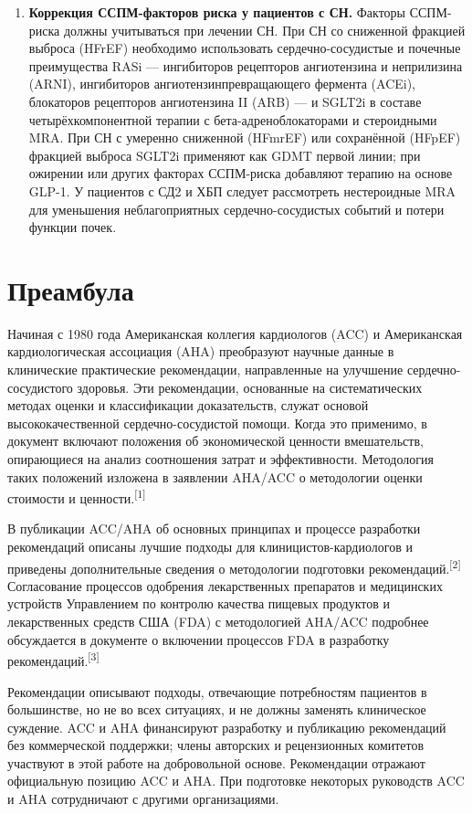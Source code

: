 \documentclass[11pt,a4paper]{article}
\newcommand{\src}[1]{\textsuperscript{[#1]}}
\begin{document}
\begin{enumerate}[label=\arabic*.]
\item \textbf{Коррекция ССПМ-факторов риска у пациентов с СН.} Факторы ССПМ-риска должны учитываться при лечении СН. При СН со сниженной фракцией выброса (HFrEF) необходимо использовать сердечно-сосудистые и почечные преимущества RASi --- ингибиторов рецепторов ангиотензина и неприлизина (ARNI), ингибиторов ангиотензинпревращающего фермента (ACEi), блокаторов рецепторов ангиотензина II (ARB) --- и SGLT2i в составе четырёхкомпонентной терапии с бета-адреноблокаторами и стероидными MRA. При СН с умеренно сниженной (HFmrEF) или сохранённой (HFpEF) фракцией выброса SGLT2i применяют как GDMT первой линии; при ожирении или других факторах ССПМ-риска добавляют терапию на основе GLP-1. У пациентов с СД2 и ХБП следует рассмотреть нестероидные MRA для уменьшения неблагоприятных сердечно-сосудистых событий и потери функции почек.
\end{enumerate}

\section*{Преамбула}
Начиная с 1980 года Американская коллегия кардиологов (ACC) и Американская кардиологическая ассоциация (AHA) преобразуют научные данные в клинические практические рекомендации, направленные на улучшение сердечно-сосудистого здоровья. Эти рекомендации, основанные на систематических методах оценки и классификации доказательств, служат основой высококачественной сердечно-сосудистой помощи. Когда это применимо, в документ включают положения об экономической ценности вмешательств, опирающиеся на анализ соотношения затрат и эффективности. Методология таких положений изложена в заявлении AHA/ACC о методологии оценки стоимости и ценности.\src{1}

В публикации ACC/AHA об основных принципах и процессе разработки рекомендаций описаны лучшие подходы для клиницистов-кардиологов и приведены дополнительные сведения о методологии подготовки рекомендаций.\src{2} Согласование процессов одобрения лекарственных препаратов и медицинских устройств Управлением по контролю качества пищевых продуктов и лекарственных средств США (FDA) с методологией AHA/ACC подробнее обсуждается в документе о включении процессов FDA в разработку рекомендаций.\src{3}

Рекомендации описывают подходы, отвечающие потребностям пациентов в большинстве, но не во всех ситуациях, и не должны заменять клиническое суждение. ACC и AHA финансируют разработку и публикацию рекомендаций без коммерческой поддержки; члены авторских и рецензионных комитетов участвуют в этой работе на добровольной основе. Рекомендации отражают официальную позицию ACC и AHA. При подготовке некоторых руководств ACC и AHA сотрудничают с другими организациями.
\end{document}
